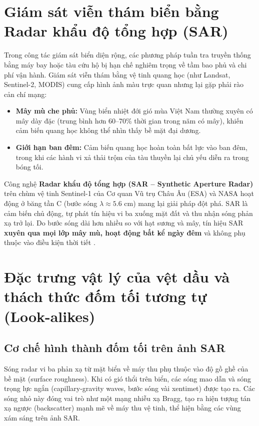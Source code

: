 \section{Giám sát viễn thám biển bằng Radar khẩu độ tổng hợp (SAR)}
\label{sec:sar_overview}
Trong công tác giám sát biển diện rộng, các phương pháp tuần tra truyền thống bằng máy bay hoặc tàu cứu hộ bị hạn chế nghiêm trọng về tầm bao phủ và chi phí vận hành. Giám sát viễn thám bằng vệ tinh quang học (như Landsat, Sentinel-2, MODIS) cung cấp hình ảnh màu trực quan nhưng lại gặp phải rào cản chí mạng:
\begin{itemize}
    \item \textbf{Mây mù che phủ:} Vùng biển nhiệt đới gió mùa Việt Nam thường xuyên có mây dày đặc (trung bình hơn 60--70\% thời gian trong năm có mây), khiến cảm biến quang học không thể nhìn thấy bề mặt đại dương.
    \item \textbf{Giới hạn ban đêm:} Cảm biến quang học hoàn toàn bất lực vào ban đêm, trong khi các hành vi xả thải trộm của tàu thuyền lại chủ yếu diễn ra trong bóng tối.
\end{itemize}

Công nghệ \textbf{Radar khẩu độ tổng hợp (SAR -- Synthetic Aperture Radar)} trên chùm vệ tinh Sentinel-1 của Cơ quan Vũ trụ Châu Âu (ESA) và NASA hoạt động ở băng tần C (bước sóng $\lambda \approx 5.6$ cm) mang lại giải pháp đột phá. SAR là cảm biến chủ động, tự phát tín hiệu vi ba xuống mặt đất và thu nhận sóng phản xạ trở lại. Do bước sóng dài hơn nhiều so với hạt sương và mây, tín hiệu SAR \textbf{xuyên qua mọi lớp mây mù, hoạt động bất kể ngày đêm} và không phụ thuộc vào điều kiện thời tiết \cite{brekke2005oil, solberg2007sar}.

\section{Đặc trưng vật lý của vệt dầu và thách thức đốm tối tương tự (Look-alikes)}
\label{sec:physical_principles}

\subsection{Cơ chế hình thành đốm tối trên ảnh SAR}
Sóng radar vi ba phản xạ từ mặt biển về máy thu phụ thuộc vào độ gồ ghề của bề mặt (surface roughness). Khi có gió thổi trên biển, các sóng mao dẫn và sóng trọng lực ngắn (capillary-gravity waves, bước sóng vài xentimet) được tạo ra. Các sóng nhỏ này đóng vai trò như một mạng nhiễu xạ Bragg, tạo ra hiện tượng tán xạ ngược (backscatter) mạnh mẽ về máy thu vệ tinh, thể hiện bằng các vùng xám sáng trên ảnh SAR.

